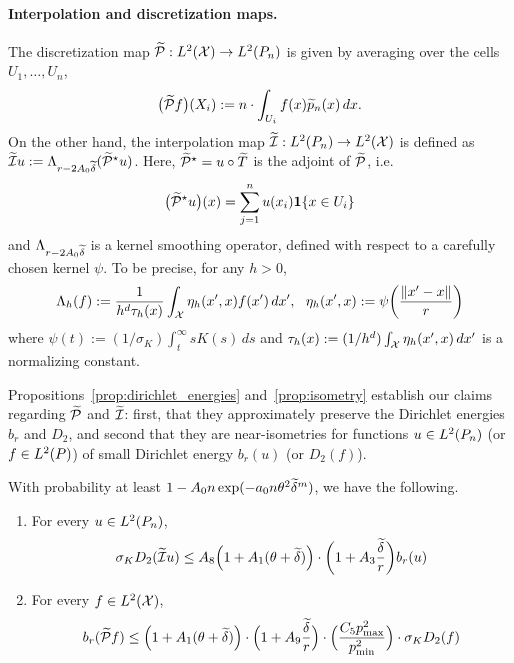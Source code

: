 \paragraph{Interpolation and discretization maps.}
The discretization map  $\widetilde{\mathcal{P}}: L^2(\mathcal{X}) \to L^2(P_n)$ is given by averaging over the cells $U_1,\ldots,U_n$, 
\begin{equation*}
\bigl(\widetilde{\mathcal{P}}f\bigr)(X_i) := n \cdot \int_{U_i} f(x) \widetilde{p}_n(x) \,dx.
\end{equation*}
On the other hand, the interpolation map $\widetilde{\mathcal{I}}: L^2(P_n) \to L^2(\mathcal{X})$ is defined as $\widetilde{\mathcal{I}}u := \Lambda_{r - 2A_0\widetilde{\delta}}(\widetilde{\mathcal{P}}^{\star}u)$. Here, $\widetilde{\mathcal{P}}^{\star} = u \circ \widetilde{T}$ is the adjoint of $\widetilde{\mathcal{P}}$, i.e.
\begin{equation*}
\bigl(\widetilde{\mathcal{P}}^{\star}u\bigr)(x) = \sum_{j = 1}^{n} u(x_i) \mathbf{1}\{x \in U_i\} 
\end{equation*} 
and $\Lambda_{r - 2A_0\widetilde{\delta}}$ is a kernel smoothing operator, defined with respect to a carefully chosen kernel $\psi$. To be precise, for any $h > 0$,
\begin{equation*}
\Lambda_h(f) := \frac{1}{h^d\tau_h(x)}\int_{\mathcal{X}} \eta_h(x',x) f(x') \,dx',~~ \eta_h(x',x) := \psi\biggl(\frac{\|x' - x\|}{r}\biggr)
\end{equation*}
where $\psi(t) := (1/\sigma_K)\int_{t}^{\infty} s K(s) \,ds$ and $\tau_h(x) := (1/h^d)\int_{\mathcal{X}} \eta_h(x',x) \,dx'$ is a normalizing constant.

Propositions~\ref{prop:dirichlet_energies} and~\ref{prop:isometry} establish our claims regarding $\widetilde{\mathcal{P}}$ and $\widetilde{\mathcal{I}}$: first, that they approximately preserve the Dirichlet energies $b_r$ and $D_2$, and second that they are near-isometries for functions $u \in L^2(P_n)$ (or $f \in L^2(P)$) of small Dirichlet energy $b_r(u)$ (or $D_2(f)$).

\begin{proposition}
	\label{prop:dirichlet_energies}
	With probability at least $1 - A_0n\exp(-a_0n\theta^2\widetilde{\delta}^{m})$, we have the following.
	\begin{enumerate}[(1)]
		\item For every $u \in L^2(P_n)$,
		\begin{equation}
		\label{eqn:dirichlet_energies_1}
		\sigma_{K} D_2(\widetilde{\mathcal{I}}u) \leq A_8 \Bigl(1 + A_1(\theta + \widetilde{\delta})\Bigr) \cdot \biggl(1 + A_3\frac{\widetilde{\delta}}{r}\biggr) b_r(u)
		\end{equation}
		\item For every $f \in L^2(\mathcal{X})$,
		\begin{equation}
		\label{eqn:dirichlet_energies_2}
		b_r(\widetilde{\mathcal{P}}f) \leq \Bigl(1 + A_1(\theta + \widetilde{\delta})\Bigr) \cdot \Bigl(1 + A_9\frac{\widetilde{\delta}}{r}\Bigr) \cdot \Bigl(\frac{C_5 p_{\max}^2}{p_{\min}^2}\Bigr) \cdot \sigma_{K} D_2(f)
		\end{equation}
	\end{enumerate}
\end{proposition}

